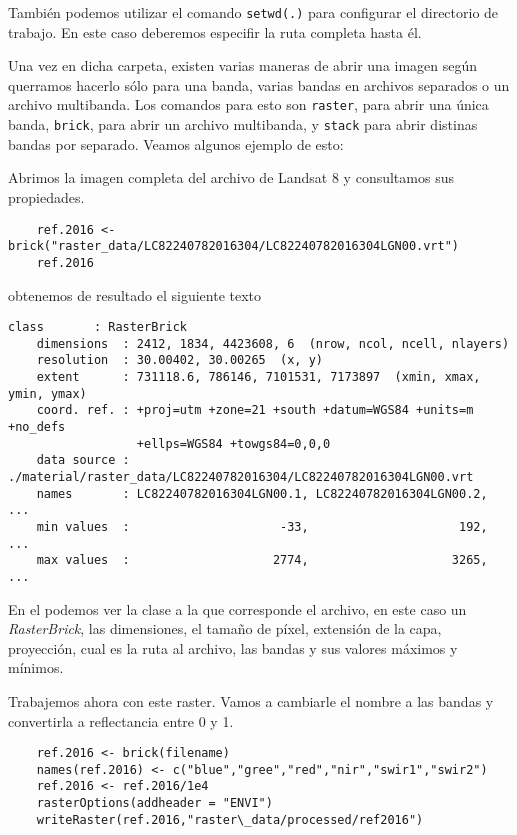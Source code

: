 Tambi\'en podemos utilizar el comando \texttt{setwd(.)} para configurar el
directorio de trabajo. En este caso deberemos especifir la ruta completa hasta
\'el.

Una vez en dicha carpeta, existen varias maneras de abrir una imagen seg\'un
querramos hacerlo s\'olo para una banda, varias bandas en archivos separados o un
archivo multibanda. Los comandos para esto son \texttt{raster}, para abrir una \'unica banda,
\texttt{brick}, para abrir un archivo multibanda, y \texttt{stack} para abrir
distinas bandas por separado. Veamos algunos ejemplo de esto:

\begin{exa}
    Abrimos la imagen completa del archivo de Landsat 8 y consultamos sus
    propiedades.
    \begin{lstlisting}
    ref.2016 <- brick("raster_data/LC82240782016304/LC82240782016304LGN00.vrt")
    ref.2016
    \end{lstlisting}
    obtenemos de resultado el siguiente texto
    \begin{Verbatim}[fontsize=\small]
    class       : RasterBrick
    dimensions  : 2412, 1834, 4423608, 6  (nrow, ncol, ncell, nlayers)
    resolution  : 30.00402, 30.00265  (x, y)
    extent      : 731118.6, 786146, 7101531, 7173897  (xmin, xmax, ymin, ymax)
    coord. ref. : +proj=utm +zone=21 +south +datum=WGS84 +units=m +no_defs
                  +ellps=WGS84 +towgs84=0,0,0
    data source : ./material/raster_data/LC82240782016304/LC82240782016304LGN00.vrt
    names       : LC82240782016304LGN00.1, LC82240782016304LGN00.2, ...
    min values  :                     -33,                     192, ...
    max values  :                    2774,                    3265, ...
    \end{Verbatim}
    En el podemos ver la clase a la que corresponde el archivo, en este
    caso un \emph{RasterBrick}, las dimensiones, el tamaño de p\'ixel, extensi\'on
    de la capa, proyecci\'on, cual es la ruta al archivo, las bandas y
    sus valores m\'aximos y m\'inimos.

    Trabajemos ahora con este raster. Vamos a cambiarle el nombre a las bandas
    y convertirla a reflectancia entre 0 y 1.

    \begin{lstlisting}
    ref.2016 <- brick(filename)
    names(ref.2016) <- c("blue","gree","red","nir","swir1","swir2")
    ref.2016 <- ref.2016/1e4
    rasterOptions(addheader = "ENVI")
    writeRaster(ref.2016,"raster\_data/processed/ref2016")
    \end{lstlisting}


\end{exa}

